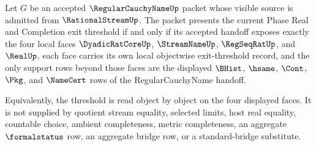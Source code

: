 \begin{theorem}
\label{thm:regularcauchyname-real-completion-exit-threshold-equivalence}
Let $G$ be an accepted $\RegularCauchyNameUp$ packet whose visible source is admitted from $\RationalStreamUp$. The packet presents the current Phase Real and Completion exit threshold if and only if its accepted handoff exposes exactly the four local faces $\DyadicRatCoreUp$, $\StreamNameUp$, $\RegSeqRatUp$, and $\RealUp$, each face carries its own local objectwise exit-threshold record, and the only support rows beyond those faces are the displayed $\BHist$, $\hsame$, $\Cont$, $\Pkg$, and $\NameCert$ rows of the RegularCauchyName handoff.

Equivalently, the threshold is read object by object on the four displayed faces. It is not supplied by quotient stream equality, selected limits, host real equality, countable choice, ambient completeness, metric completeness, an aggregate $\formalstatus$ row, an aggregate bridge row, or a standard-bridge substitute.
\end{theorem}
